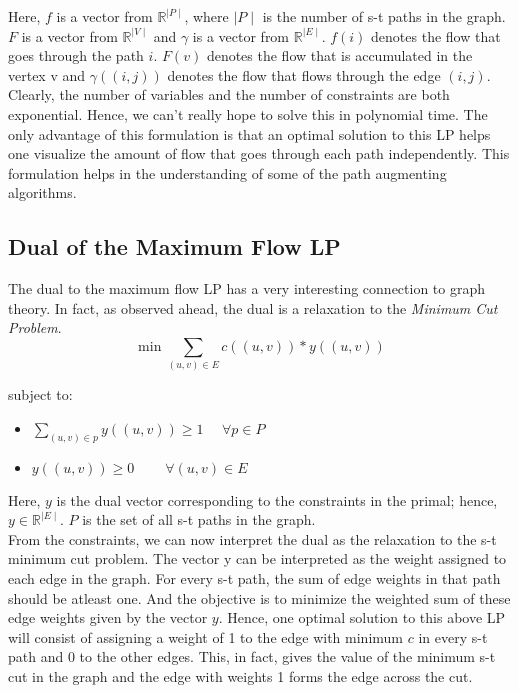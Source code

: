 \documentclass[BTech]{iitmdiss}
\begin{document}
	  Here, $f$ is a vector from $\mathbb{R}^{\mid P\mid }$, where $\mid P\mid $ is the number of s-t paths in the graph. $F$ is a vector from $\mathbb{R}^{\mid V\mid }$
	  and $\gamma$ is a vector from $\mathbb{R}^{\mid E\mid }$. $f(i)$ denotes the flow that goes through the path $i$. $F(v)$ denotes the flow that 
	  is accumulated in the vertex v and $\gamma((i,j))$ denotes the flow that flows through the edge $(i,j)$. \\
	  
	  Clearly, the number of variables and the number of constraints are both exponential. Hence, we can't really hope to solve this in polynomial
	  time. The only advantage of this formulation is that an optimal solution to this LP helps one visualize the amount of flow that goes through
	  each path independently. This formulation helps in the understanding of some of the path augmenting algorithms.
	
	\subsection{Dual of the Maximum Flow LP}
	  The dual to the maximum flow LP has a very interesting connection to graph theory. In fact, as observed ahead, the dual is a relaxation 
	  to the \textit{Minimum Cut Problem}. \\
	  
	  $$\min \displaystyle\sum_{(u,v) \in E} c((u,v)) \ast y((u,v))$$
	  
	  subject to:
	  \begin{itemize}
	   \item 
	    $\displaystyle \sum_{(u,v) \in p} y((u,v)) \geq 1~~~~~~\forall p \in P$
	   \item
	    $y((u,v)) \geq 0 ~~~~~~~~~~ \forall (u,v) \in E$
	   
	  \end{itemize}

	  Here, $y$ is the dual vector corresponding to the constraints in the primal; hence, $y \in \mathbb{R}^{\mid E\mid }$.  $P$ is the set of all
	  s-t paths in the graph. \\
	  
	  From the constraints, we can now interpret the dual as the relaxation to the s-t minimum cut problem. The vector y can be interpreted 
	  as the weight assigned to each edge in the graph. For every s-t path, the sum of edge weights in that path should be atleast one. And the 
	  objective is to minimize the weighted sum of these edge weights given by the vector $y$. Hence, one optimal solution to this above LP
	  will consist of assigning a weight of 1 to the edge with minimum $c$ in every s-t path and 0 to the other edges. This, in fact, gives the 
	  value of the minimum s-t cut in the graph and the edge with weights 1 forms the edge across the cut. \\
	  
\end{document}
